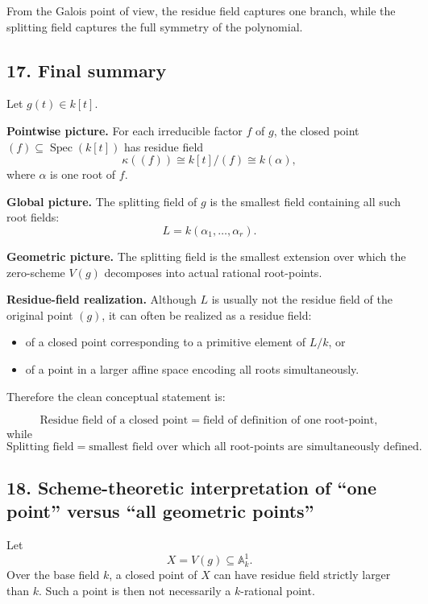 \documentclass[12pt,a4paper]{article}
\theoremstyle{plain}
\theoremstyle{definition}      %
\begin{document}
From the Galois point of view, the residue field captures one branch, while the splitting field captures the full symmetry of the polynomial.

\subsection*{17. Final summary}

Let \(g(t)\in k[t]\).

\medskip

\textbf{Pointwise picture.}
For each irreducible factor \(f\) of \(g\), the closed point \((f)\subseteq \operatorname{Spec}(k[t])\) has residue field
\[
\kappa((f))\cong k[t]/(f)\cong k(\alpha),
\]
where \(\alpha\) is one root of \(f\).

\medskip

\textbf{Global picture.}
The splitting field of \(g\) is the smallest field containing all such root fields:
\[
L=k(\alpha_1,\dots,\alpha_r).
\]

\medskip

\textbf{Geometric picture.}
The splitting field is the smallest extension over which the zero-scheme \(V(g)\) decomposes into actual rational root-points.

\medskip

\textbf{Residue-field realization.}
Although \(L\) is usually not the residue field of the original point \((g)\), it can often be realized as a residue field:
\begin{itemize}
	\item of a closed point corresponding to a primitive element of \(L/k\), or
	\item of a point in a larger affine space encoding all roots simultaneously.
\end{itemize}

\medskip

Therefore the clean conceptual statement is:

\[
\boxed{
	\text{Residue field of a closed point}=\text{field of definition of one root-point},
}
\]
while
\[
\boxed{
	\text{Splitting field}=\text{smallest field over which all root-points are simultaneously defined}.
}
\]	
	
	
\subsection*{18. Scheme-theoretic interpretation of ``one point'' versus ``all geometric points''}

Let
\[
X=V(g)\subseteq \mathbb A^1_k.
\]
Over the base field \(k\), a closed point of \(X\) can have residue field strictly larger than \(k\). Such a point is then not necessarily a \(k\)-rational point.
\end{document}
